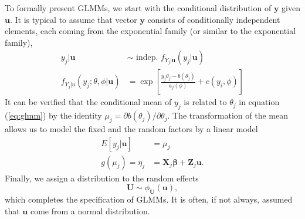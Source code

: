 To formally present GLMMs, we start with the conditional distribution of $\bm y$ given $\bm u$. It
is typical to assume that vector $\bm y$ consists of conditionally independent elements, each coming
from the exponential family (or similar to the exponential family), 
\begin{equation}\label{eq:glmm}
	\begin{split}
		y_j|\bm u & \sim \text{~indep.~} f_{Y_j |\bm u} (y_j|\bm u) \\
		f_{Y_j|u}(y_j; \theta, \phi|\bm u) &= \exp \left[ \frac{y_j\theta_j	 -b(\theta_j)}{a_j(\phi)}
		+ c(y_i, \phi)\right]
	\end{split}
\end{equation}	
It can be verified that the conditional mean of $y_j$ is related to $\theta_j$ in equation
(\ref{eq:glmm}) by the identity $\mu_j = \partial b(\theta_j)/\partial \theta_j$. The transformation
of the mean allows us to model the fixed and the random factors by a linear model
\begin{equation}\label{eq:glmm2}
	\begin{split}
		E[y_j|\bm u] &= \mu_j\\
		g(\mu_j) = \eta_j &= \bm X_j\bm \beta + \bm Z_j\bm u.
	\end{split}
\end{equation}
Finally, we assign a distribution to the random effects
\begin{equation}
	\bm U \sim \phi_{\bm U}(\bm u),
\end{equation}
which completes the specification of GLMMs. It is often, if not always, assumed that $\bm u$ come
from a normal distribution.

